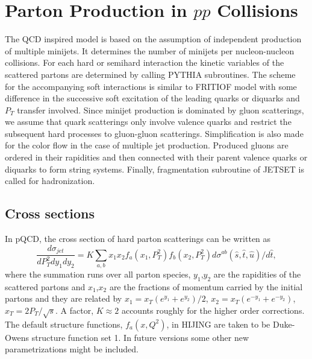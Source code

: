 \section{Parton Production in $pp$ Collisions}

        The QCD inspired model is based on the assumption of 
independent production of multiple minijets. It determines 
the number of minijets per nucleon-nucleon collisions. 
For each hard or semihard interaction the kinetic variables of 
the scattered partons are determined by calling PYTHIA\cite{pythia}
subroutines. The  scheme for the accompanying soft interactions 
is similar to FRITIOF model\cite{fritiof} with some difference 
in the successive soft excitation of the leading quarks or 
diquarks and $P_T$ transfer involved.  Since minijet production
is dominated by gluon scatterings, we assume that quark 
scatterings only involve valence quarks and restrict the subsequent
hard processes to gluon-gluon scatterings. Simplification is
also made for the color flow in the case of multiple jet
production. Produced gluons are ordered in their rapidities
and then connected with their parent valence quarks or diquarks 
to form string systems. Finally, fragmentation subroutine of JETSET 
is called for hadronization. 


\subsection{Cross sections}
\label{sec:jet1}

        In pQCD, the cross section of hard parton scatterings
can be written as\cite{eichten}
\begin{equation}
        \frac{d\sigma_{jet}}{dP_T^2dy_1dy_2} =
        K\sum_{a,b} x_1 x_2 f_a(x_1,P_T^2)f_b(x_2,P_T^2)
        d\sigma^{ab}(\hat{s},\hat{t},\hat{u})/d\hat{t}, \label{eq:sjet1}
\end{equation}
where the summation runs over all parton species, $y_1$,$y_2$ 
are the rapidities of the scattered partons and $x_1$,$x_2$ are 
the fractions of momentum carried by the initial partons and 
they are related by $x_1=x_T(e^{y_1}+e^{y_2})/2$, 
$x_2=x_T(e^{-y_1}+e^{-y_2})$, $x_T=2P_T/\sqrt{s}$. A factor, 
$K\approx 2$ accounts roughly for the higher order corrections. 
The default structure functions, $f_a(x,Q^2)$, in HIJING are taken 
to be Duke-Owens structure function set 1\cite{duke}. 
In future versions some other new parametrizations might be included. 

